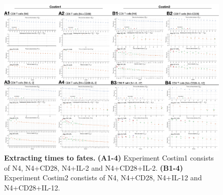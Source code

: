 \documentclass[11pt, a4paper]{article}
\begin{document}
\clearpage
\begin{figure}[H]
    \centering
    \includegraphics[scale=0.37]{figs/supp_fig3.pdf}
    \caption{\textbf{Extracting times to fates.} \textbf{(A1-4)} Experiment Costim1 consists of N4, N4+CD28, N4+IL-2 and N4+CD28+IL-2. \textbf{(B1-4)} Experiment Costim2 constists of N4, N4+CD28, N4+IL-12 and N4+CD28+IL-12.}
    \label{supp_fig:costims}
\end{figure}
\end{document}
